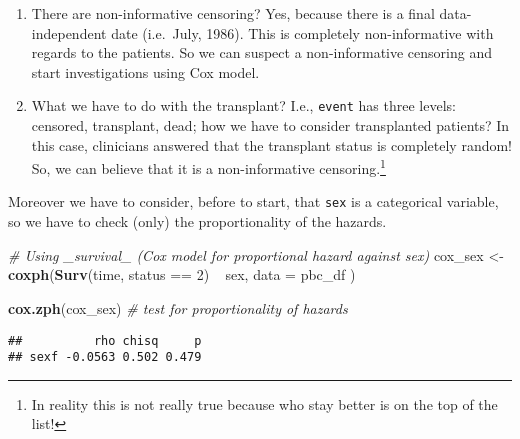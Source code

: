 \documentclass[]{book}
\newenvironment{Shaded}{\begin{snugshade}}{\end{snugshade}}
\newcommand{\KeywordTok}[1]{\textcolor[rgb]{0.13,0.29,0.53}{\textbf{{#1}}}}
\newcommand{\DataTypeTok}[1]{\textcolor[rgb]{0.13,0.29,0.53}{{#1}}}
\newcommand{\DecValTok}[1]{\textcolor[rgb]{0.00,0.00,0.81}{{#1}}}
\newcommand{\StringTok}[1]{\textcolor[rgb]{0.31,0.60,0.02}{{#1}}}
\newcommand{\CommentTok}[1]{\textcolor[rgb]{0.56,0.35,0.01}{\textit{{#1}}}}
\newcommand{\NormalTok}[1]{{#1}}
\let\rmarkdownfootnote\footnote%
\def\footnote{\protect\rmarkdownfootnote}
\theoremstyle{definition}
\theoremstyle{definition}
\theoremstyle{definition}
\theoremstyle{remark}
\begin{document}
\begin{enumerate}
\def\labelenumi{\arabic{enumi}.}
\item
  There are non-informative censoring? Yes, because there is a final
  data-independent date (i.e.~July, 1986). This is completely
  non-informative with regards to the patients. So we can suspect a
  non-informative censoring and start investigations using Cox model.
\item
  What we have to do with the transplant? I.e., \texttt{event} has three
  levels: censored, transplant, dead; how we have to consider
  transplanted patients? In this case, clinicians answered that the
  transplant status is completely random! So, we can believe that it is
  a non-informative censoring.\footnote{In reality this is not really
    true because who stay better is on the top of the list!}
\end{enumerate}

Moreover we have to consider, before to start, that \texttt{sex} is a
categorical variable, so we have to check (only) the proportionality of
the hazards.

\begin{Shaded}
\begin{Highlighting}[]
\CommentTok{# Using _survival_ (Cox model for proportional hazard against sex)}
\NormalTok{cox_sex <-}\StringTok{ }\KeywordTok{coxph}\NormalTok{(}\KeywordTok{Surv}\NormalTok{(time, status ==}\StringTok{ }\DecValTok{2}\NormalTok{) ~}\StringTok{ }\NormalTok{sex,}
  \DataTypeTok{data =} \NormalTok{pbc_df}
\NormalTok{)}

\KeywordTok{cox.zph}\NormalTok{(cox_sex)                           }\CommentTok{# test for proportionality of hazards}
\end{Highlighting}
\end{Shaded}

\begin{verbatim}
##          rho chisq     p
## sexf -0.0563 0.502 0.479
\end{verbatim}

\begin{Shaded}
\end{Shaded}
\end{document}
